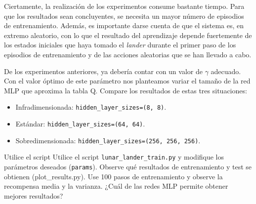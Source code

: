 \documentclass{article}
\begin{document}
Ciertamente, la realización de los experimentos consume bastante tiempo. Para que los resultados sean concluyentes, se necesita un mayor número de episodios de entrenamiento. Además, es importante darse cuenta de que el sistema es, en extremo aleatorio, con lo que el resultado del aprendizaje depende fuertemente de los estados iniciales que haya tomado el \textit{lander} durante el primer paso de los episodios de entrenamiento y de las acciones aleatorias que se han llevado a cabo. %





\begin{exercise}
De los experimentos anteriores, ya debería contar con un valor de $\gamma$ adecuado. Con el valor óptimo de este parámetro nos planteamos variar el tamaño de la red MLP que aproxima la tabla Q. Compare los resultados de estas tres situaciones:
\begin{itemize}
    \item Infradimensionada: \texttt{hidden\_layer\_sizes=(8, 8)}.
\item Estándar: \texttt{hidden\_layer\_sizes=(64, 64)}.
\item Sobredimensionada: \texttt{hidden\_layer\_sizes=(256, 256, 256)}.
\end{itemize}

Utilice el script Utilice el script \texttt{lunar\_lander\_train.py} y modifique los parámetros deseados (\texttt{params}). Observe qué resultados de entrenamiento y test se obtienen (plot\_results.py). Use 100 pasos de entrenamiento y observe la recompensa media y la varianza. ¿Cuál de las redes MLP permite obtener mejores resultados?
\end{exercise}
\end{document}
